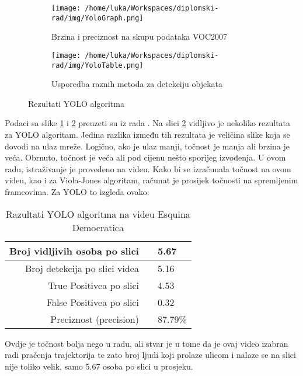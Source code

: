 \begin{figure}[htp]
	\centering
	\begin{subfigure}[b]{0.4\linewidth}
		\texttt{[image: /home/luka/Workspaces/diplomski-rad/img/YoloGraph.png]}
		\caption{Brzina i preciznost na skupu podataka VOC2007}
		\label{img:yolo_graph}
	\end{subfigure}
	\begin{subfigure}[b]{0.4\linewidth}
		\texttt{[image: /home/luka/Workspaces/diplomski-rad/img/YoloTable.png]}
		\caption{Usporedba raznih metoda za detekciju objekata}
		\label{img:yolo_table}
	\end{subfigure}
\caption{Rezultati YOLO algoritma}
\label{img:yolo_paper}
\end{figure}

Podaci sa slike \ref{img:yolo_graph} i \ref{img:yolo_table} preuzeti su iz rada \citep{YOLO}. Na slici \ref{img:yolo_table} vidljivo je nekoliko rezultata za YOLO algoritam. Jedina razlika između tih rezultata je veličina slike koja se dovodi na ulaz mreže. Logično, ako je ulaz manji, točnost je manja ali brzina je veća. Obrnuto, točnost je veća ali pod cijenu nešto sporijeg izvođenja. U ovom radu, istraživanje je provedeno na videu. Kako bi se izračunala točnost na ovom videu, kao i za Viola-Jones algoritam, računat je prosijek točnosti na spremljenim frameovima. Za YOLO to izgleda ovako:

\begin{table}[h]
\centering
\begin{tabular}{|rcl|}
\hline
	Broj vidljivih osoba po slici & & 5.67\\
\hline
	Broj detekcija po slici videa & & 5.16\\
\hline
	True Positivea po slici & & 4.53\\
\hline
	False Positivea po slici & & 0.32\\
\hline
	Preciznost (precision) & & 87.79\%\\
\hline
\end{tabular}
\caption{Razultati YOLO algoritma na videu Esquina Democratica}
\label{tab:Yolo_result}
\end{table}

Ovdje je točnost bolja nego u radu, ali stvar je u tome da je ovaj video izabran radi pračenja trajektorija te zato broj ljudi koji prolaze ulicom i nalaze se na slici nije toliko velik, samo 5.67 osoba po slici u prosjeku.

